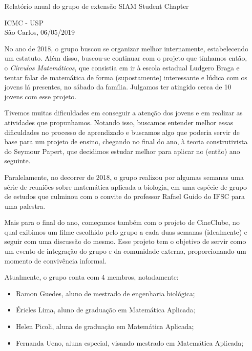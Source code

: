 \documentclass{article}
\begin{document}
\begin{titlepage}
  \begin{center}
    \vspace*{\fill}
    \begin{LARGE}
      Relatório anual do grupo de extensão SIAM Student Chapter\\[1.5cm]
    \end{LARGE}
    \vspace*{\fill}
    \vfill
    \begin{normalsize}
      ICMC - USP\\
      São Carlos, 06/05/2019
    \end{normalsize}
  \end{center}
\end{titlepage}




No ano de 2018, o grupo buscou se organizar melhor internamente,
estabelecendo um estatuto. Além disso, buscou-se continuar com o
projeto que tínhamos então, o {\it Círculos Matemáticos}, que consistia
em ir à escola estadual Ludgero Braga e tentar falar de matemática de
forma (supostamente) interessante e lúdica com os jovens lá presentes,
no sábado da família. Julgamos ter atingido cerca de 10 jovens com
esse projeto.

Tivemos muitas dificuldades em conseguir a atenção dos jovens e em
realizar as atividades que propunhamos. Notando isso, buscamos entender
melhor essas dificuldades no processo de aprendizado e buscamos algo
que poderia servir de base para um projeto de ensino, chegando no
final do ano, à teoria construtivista do Seymour Papert, que decidimos
estudar melhor para aplicar no (então) ano seguinte.

Paralelamente, no decorrer de 2018, o grupo realizou por algumas semanas uma série de
reuniões sobre matemática aplicada a biologia, em uma espécie de grupo
de estudos que culminou com o convite do professor Rafael Guido do
IFSC para uma palestra.

Mais para o final do ano, começamos também com o projeto de CineClube, no
qual exibimos um filme escolhido pelo grupo a cada duas
semanas (idealmente) e seguir com uma discussão do mesmo. Esse projeto tem o
objetivo de servir como um evento de integração do grupo e da
comunidade externa, proporcionando um momento de convivência informal.

Atualmente, o grupo conta com 4 membros, notadamente:

\begin{itemize}
\item Ramon Guedes, aluno de mestrado de engenharia biológica;
\item Éricles Lima, aluno de graduação em Matemática Aplicada;
\item Helen Picoli, aluna de graduação em Matemática Aplicada;
\item Fernanda Ueno, aluna especial, visando mestrado em Matemática Aplicada;
\end{itemize}
\end{document}
